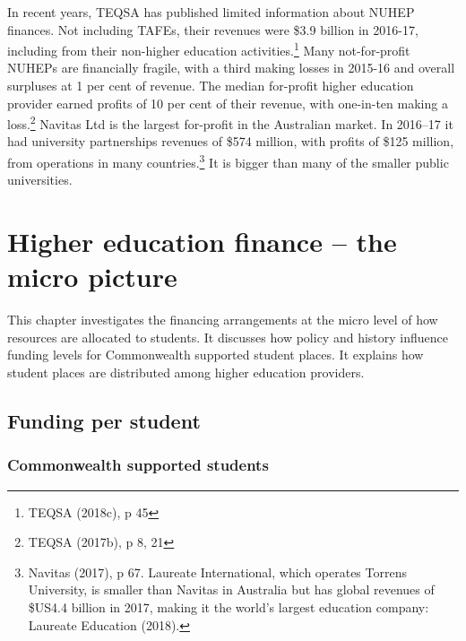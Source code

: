 \documentclass{grattan}
\begin{document}
In recent years, TEQSA has published limited information about NUHEP finances. Not including TAFEs, their revenues were \$3.9 billion in 2016-17, including from their non-higher education activities.\footnote{TEQSA (2018c), p 45} Many not-for-profit NUHEPs are financially fragile, with a third making losses in 2015-16 and overall surpluses at 1 per cent of revenue. The median for-profit higher education provider earned profits of 10 per cent of their revenue, with one-in-ten making a loss.\footnote{TEQSA (2017b), p 8, 21} Navitas Ltd is the largest for-profit in the Australian market. In 2016--17 it had university partnerships revenues of \$574 million, with profits of \$125 million, from operations in many countries.\footnote{Navitas (2017), p 67. Laureate International, which operates Torrens University, is smaller than Navitas in Australia but has global revenues of \$US4.4 billion in 2017, making it the world's largest education company: Laureate Education (2018).} It is bigger than many of the smaller public universities.

%
\chapter{Higher education finance -- the micro picture}\label{chap:higher-education-finance-the-micro-picture}

This chapter investigates the financing arrangements at the micro level of how resources are allocated to students. It discusses how policy and history influence funding levels for Commonwealth supported student places. It explains how student places are distributed among higher education providers.

%
\section{Funding per student}\label{sec:funding-per-student}

%
\subsection{Commonwealth supported students}\label{subsec:commonwealth-supported-students}
\end{document}
